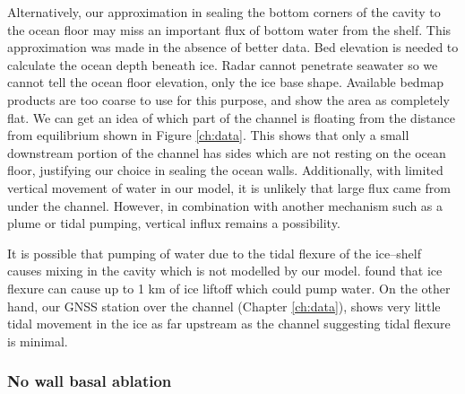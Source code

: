 Alternatively, our approximation in sealing the bottom corners of the cavity to the ocean floor may miss an important flux of bottom water from the shelf. This approximation was made in the absence of better data. Bed elevation is needed to calculate the ocean depth beneath ice.  Radar cannot penetrate seawater so we cannot tell the ocean floor elevation, only the ice base shape. Available bedmap products \citep[e.g.]{fretwell2013bedmap2} are too coarse to use for this purpose, and show the area as completely flat. 
We can get an idea of which part of the channel is floating from the distance from equilibrium shown in Figure \ref{ch:data}. This shows that only a small downstream portion of the channel has sides which are not resting on the ocean floor, justifying our choice in sealing the ocean walls. Additionally, with limited vertical movement of water in our model, it is unlikely that large flux came from under the channel. However, in combination with another mechanism such as a plume or tidal pumping, vertical influx remains a possibility.


It is possible that pumping of water due to the tidal flexure of the ice--shelf causes mixing in the cavity which is not modelled by our model.  \cite{walker2013ice} found that ice flexure can cause up to 1 km of ice liftoff which could pump water. On the other hand, our GNSS station over the channel (Chapter \ref{ch:data}), shows very little tidal movement in the ice as far upstream as the channel suggesting tidal flexure is minimal. 



\subsubsection{No wall basal ablation}

